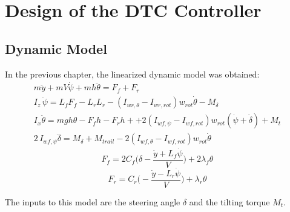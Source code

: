 \section{Design of the DTC Controller}
\subsection{Dynamic Model}
In the previous chapter, the linearized dynamic model was obtained:
\begin{eqnarray}
\label{dynamic_model_1}
m\ddot{y}+mV \dot{\psi}+mh\ddot{\theta}=F_{f}+F_{r} \\
I_{z}\,\ddot{\psi}=L_{f}F_{f}-L_{r}L_{r}-(I_{wr,\theta}-I_{wr,rot})w_{rot}\dot{\theta}-M_{\delta}\\
I_{x} \ddot{\theta}=mgh\theta -F_{f}h-F_{r}h + +2(I_{wf,\psi}-I_{wf,rot})w_{rot}(\dot{\psi}+\dot{\delta}) +M_{t}\\
2\,I_{wf,\psi}\ddot{\delta}=M_{\delta}+M_{trail}-2(I_{wf,\theta}-I_{wf,rot})w_{rot}\dot{\theta}
\label{dynamic_model_2}
\end{eqnarray}
\[F_{f}=2 C_{f}\Big(\delta - \frac{\dot{y}+L_{f} \dot{\psi}}{V} \Big) + 2 \lambda_{f} \theta\]
\[F_{r}=C_{r}\Big(- \frac{\dot{y}-L_{r} \dot{\psi}}{V} \Big) +\lambda_{r} \theta\]

The inputs to this model are the steering angle $\delta$ and the tilting torque $M_{t}$.

